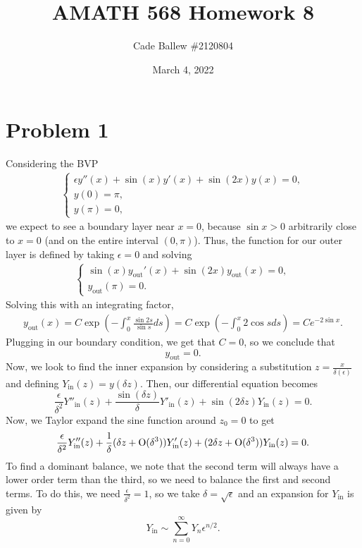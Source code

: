 \documentclass{article}
\title{AMATH 568 Homework 8}
\author{Cade Ballew \#2120804}
\date{March 4, 2022}
\begin{document}
	
\maketitle
	
\section{Problem 1}
Considering the BVP 
  \begin{align*}
    \begin{cases} \epsilon y''(x) + \sin(x) y'(x) + \sin(2x) y(x) = 0,\\
      y(0) = \pi,\\
      y(\pi) = 0, \end{cases}
  \end{align*}
we expect to see a boundary layer near $x=0$, because $\sin x>0$ arbitrarily close to $x=0$ (and on the entire interval $(0,\pi)$). Thus, the function for our outer layer is defined by taking $\epsilon=0$ and solving
  \begin{align*}
    \begin{cases}\sin(x) y_{\text{out}}'(x) + \sin(2x) y_{\text{out}}(x) = 0,\\
      y_{\text{out}}(\pi) = 0. \end{cases}
  \end{align*}
Solving this with an integrating factor,
\begin{align*}
y_{\text{out}}(x)=C\exp\left(-\int_0^x\frac{\sin 2s}{\sin s}ds\right)=C\exp\left(-\int_0^x2\cos s ds\right)=Ce^{-2\sin x}.
\end{align*}
Plugging in our boundary condition, we get that $C=0$, so we conclude that 
\[
y_{\text{out}}=0.
\]
Now, we look to find the inner expansion by considering a substitution $z=\frac{x}{\delta(\epsilon)}$ and defining $Y_{\text{in}}(z)=y(\delta z)$. Then, our differential equation becomes 
\[
\frac{\epsilon}{\delta^2}Y''_{\text{in}}(z)+\frac{\sin (\delta z)}{\delta}Y'_{\text{in}}(z)+\sin(2\delta z)Y_{\text{in}}(z)=0.
\]
Now, we Taylor expand the sine function around $z_0=0$ to get
\[
\frac{\epsilon}{\delta^2}Y''_{\text{in}}(z)+\frac{1}{\delta}(\delta z+\operatorname{O}(\delta^3))Y'_{\text{in}}(z)+(2\delta z+\operatorname{O}(\delta^3))Y_{\text{in}}(z)=0.
\]
To find a dominant balance, we note that the second term will always have a lower order term than the third, so we need to balance the first and second terms. To do this, we need $\frac{\epsilon}{\delta^2}=1$, so we take $\delta=\sqrt{\epsilon}$ and an expansion for $Y_{\text{in}}$ is given by 
\[
Y_{\text{in}}\sim\sum_{n=0}^\infty Y_n\epsilon^{n/2}.
\]
\end{document}
